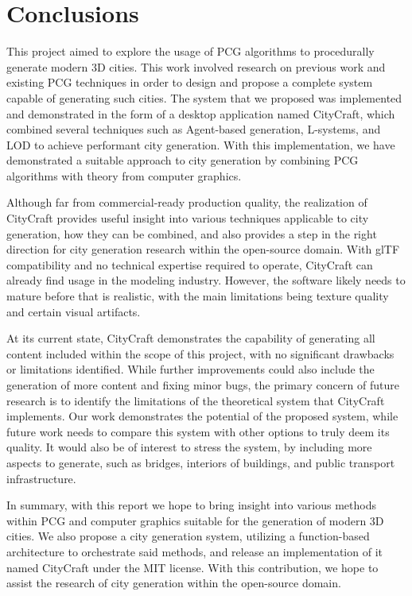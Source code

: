 \chapter{Conclusions}


This project aimed to explore the usage of PCG algorithms to procedurally generate modern 3D cities.
This work involved research on previous work and existing PCG techniques in order to design and propose a complete system capable of generating such cities.
The system that we proposed was implemented and demonstrated in the form of a desktop application named CityCraft, which combined several techniques such as Agent-based generation, L-systems, and LOD to achieve performant city generation.
With this implementation, we have demonstrated a suitable approach to city generation by combining PCG algorithms with theory from computer graphics.

Although far from commercial-ready production quality, the realization of CityCraft provides useful insight into various techniques applicable to city generation, how they can be combined, and also provides a step in the right direction for city generation research within the open-source domain.
With glTF compatibility and no technical expertise required to operate, CityCraft can already find usage in the modeling industry.
However, the software likely needs to mature before that is realistic, with the main limitations being texture quality and certain visual artifacts.

At its current state, CityCraft demonstrates the capability of generating all content included within the scope of this project, with no significant drawbacks or limitations identified.
While further improvements could also include the generation of more content and fixing minor bugs, the primary concern of future research is to identify the limitations of the theoretical system that CityCraft implements.
Our work demonstrates the potential of the proposed system, while future work needs to compare this system with other options to truly deem its quality.
It would also be of interest to stress the system, by including more aspects to generate, such as bridges, interiors of buildings, and public transport infrastructure.

In summary, with this report we hope to bring insight into various methods within PCG and computer graphics suitable for the generation of modern 3D cities.
We also propose a city generation system, utilizing a function-based architecture to orchestrate said methods, and release an implementation of it named CityCraft under the MIT license.
With this contribution, we hope to assist the research of city generation within the open-source domain.